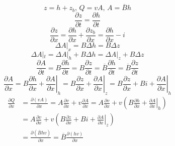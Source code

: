 \begin{equation}
    z = h + z_{b},\, Q=vA,\, A=\overline{B}h
  \end{equation}
  \begin{equation}
    \frac{\partial z}{\partial t}
    =
    \frac{\partial h}{\partial t}
  \end{equation}
\begin{equation}
    \frac{\partial z}{\partial x}
    =
    \frac{\partial h}{\partial x}
    +
    \frac{\partial z_{b}}{\partial x}
    =
    \frac{\partial h}{\partial x}
    -
    i
  \end{equation}
  \begin{equation}
    \Delta A|_{x}=B\Delta h=B\Delta z
  \end{equation}
  \begin{equation}
    \Delta A|_{t} 
    =
    \Delta A|_{h} + B\Delta h
    =
    \Delta A|_{z} + B\Delta z
  \end{equation}
  \begin{equation}
    \frac{\partial A}{\partial t}
    =
    B\frac{\partial h}{\partial t}
    =
    B\frac{\partial z}{\partial t}
    =
    \overline{B}\frac{\partial h}{\partial t}
    =
    \overline{B}\frac{\partial z}{\partial t}
  \end{equation}
  \begin{equation}
    \frac{\partial A}{\partial x}
    =
    B\frac{\partial h}{\partial x}
    +
    \left.\frac{\partial A}{\partial x}\right|_{h}
    =
    B\frac{\partial z}{\partial x}
    +
    \left.\frac{\partial A}{\partial x}\right|_{z}
    =
    B\frac{\partial z}{\partial x}
    +
    Bi
    +
    \left.\frac{\partial A}{\partial x}\right|_{h}
  \end{equation}
  \begin{equation}
    \begin{aligned}
    \frac{\partial Q}{\partial x}
    &=
    \frac{\partial (vA)}{\partial x}
    =
    A\frac{\partial v}{\partial x}
    +
    v\frac{\partial A}{\partial x}
    =
    A\frac{\partial v}{\partial x}
    +
    v
    \left(
    B\frac{\partial h}{\partial x}
    +
    \left.\frac{\partial A}{\partial x}\right|_{h}
      \right)
      \\
    &=
    A\frac{\partial v}{\partial x}
    +
    v\left(
    B\frac{\partial z}{\partial x}
    +
    Bi
    +
    \left.\frac{\partial A}{\partial x}\right|_{z}
    \right)
    \\
    &=
    \frac{\partial (\overline{B}hv)}{\partial x}
    =
    \overline{B}\frac{\partial (hv)}{\partial x}
    \end{aligned}
  \end{equation}

